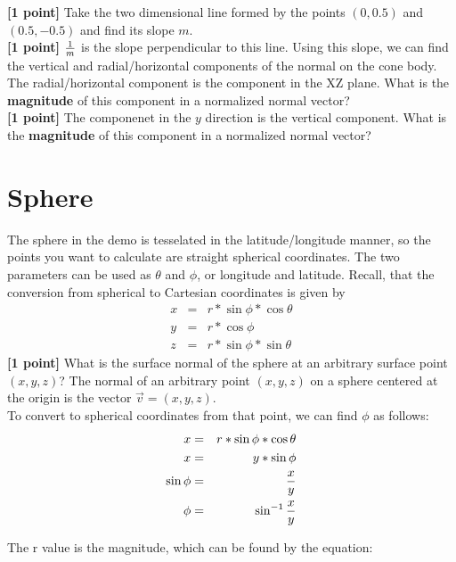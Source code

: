 \documentclass[10pt,twocolumn]{article}
\begin{document}
{\bf [1 point]} Take the two dimensional line formed by the points $(0, 0.5)$ and $(0.5, -0.5)$ and find its slope $m$.
\vspace{6em}\\
{\bf [1 point]} ${{1}\over{m}}$ is the slope perpendicular to this line. Using this slope, we
can find the vertical and radial/horizontal components of the normal on the cone body. The radial/horizontal component is the component in the XZ plane. What is the {\bf magnitude} of this component in a normalized normal vector?
\vspace{6em}\\
{\bf [1 point]} The componenet in the $y$ direction is the vertical component. What is the {\bf magnitude} of this component in a normalized normal vector?
\vspace{6em}

\section{Sphere}
The sphere in the demo is tesselated in the latitude/longitude manner, so the points you want to calculate are straight spherical coordinates. The two parameters can be used as $\theta$ and $\phi$, or longitude and latitude. Recall, that the conversion from spherical to Cartesian coordinates is given by
\begin{eqnarray*}
x & = & r * \sin{\phi} * \cos{\theta}\\
y & = & r * \cos{\phi}\\
z & = & r * \sin{\phi}*\sin{\theta}
\end{eqnarray*}
{\bf [1 point]} What is the surface normal of the sphere at an arbitrary surface point $(x,y,z)$?
\vspace{2em}
The normal of an arbitrary point $(x,y,z)$ on a sphere centered at the origin is the vector $\vec{v} = (x,y,z)$. \\
To convert to spherical coordinates from that point, we can find $\phi$ as follows: \\
\begin{eqnarray*}
x & = & r * \sin{\phi} * \cos{\theta}\\
x & = & y * \sin{\phi}\\
\sin{\phi} & = & {{x}\over{y}} \\
\phi & = & \sin^{-1}{{x}\over{y}} \\
\end{eqnarray*}

The r value is the magnitude, which can be found by the equation: \\
\end{document}

